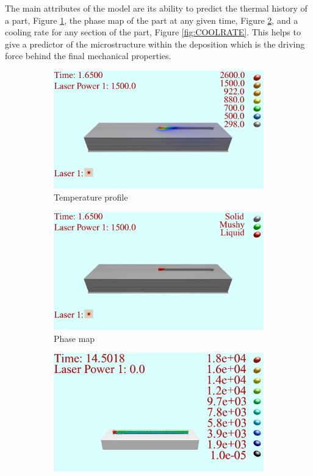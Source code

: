 \documentclass[pdflatex,sn-mathphys]{sn-jnl}
\begin{document}
	The main attributes of the model are its ability to predict the thermal history of a part, Figure \ref{fig:TEMP}, the phase map of the part at any given time, Figure \ref{fig:PHASE}, and a cooling rate for any section of the part, Figure \ref{fig:COOLRATE}.  This helps to give a predictor of the microstructure within the deposition which is the driving force behind the final mechanical properties. 
	\begin{figure}[!htb]\centering
		\begin{subfigure}[c]{0.3\textwidth}
		\centering
		\includegraphics[width=\textwidth]{TEMP}
		\caption{Temperature profile}
		\label{fig:TEMP}
		\end{subfigure}
			\begin{subfigure}[c]{0.3\textwidth}
			\centering
			\includegraphics[width=\textwidth]{PHASE}
			\caption{Phase map}
			\label{fig:PHASE}
			\end{subfigure}
				\begin{subfigure}[c]{0.3\textwidth}
				\centering
				\includegraphics[width=\textwidth]{COOLRATE}

\end{subfigure}
\end{figure}
\end{document}
